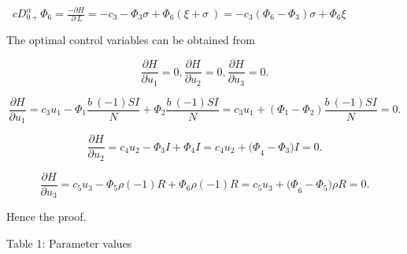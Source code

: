 \documentclass[10pt]{NSP1}
\begin{document}
$\ $ ${cD}_{0 +}^{\alpha}\Phi_{6} = \frac{- \partial H}{\ \ \partial\ L\ } = - c_{3} - \Phi_{3}\sigma + \Phi_{6}(\xi + \sigma\ ) = - c_{3}\left( \Phi_{6} - \Phi_{3} \right)\sigma + \Phi_{6}\xi$

The optimal control variables can be obtained from

\begin{equation}
\frac{\partial H}{\partial u_{1}} = 0,\frac{\partial H}{\partial u_{2}} = 0,\frac{\partial H}{\partial u_{3}} = 0.

\end{equation}

\begin{equation}
\frac{\partial H}{\partial u_{1}} = c_{3}u_{1} - \Phi_{1}\frac{b\ ( - 1)SI}{N} + \Phi_{2}\frac{b\ ( - 1)SI}{N} = c_{3}u_{1} + \left( \Phi_{1} - \Phi_{2} \right)\frac{b\ ( - 1)SI}{N} = 0.

\end{equation}

\begin{equation}
\frac{\partial H}{\partial u_{2}} = c_{4}u_{2} - \Phi_{3}I + \Phi_{4}I = c_{4}u_{2} + {(\Phi}_{4} - \Phi_{3})I = 0.

\end{equation}

\begin{equation}
\frac{\partial H}{\partial u_{3}} = c_{5}u_{3} - \Phi_{5}\rho( - 1)R + \Phi_{6}\rho( - 1)R = c_{5}u_{3} + {(\Phi}_{6} - \Phi_{5})\rho R = 0.

\end{equation}

Hence the proof.

Table 1: Parameter values
\end{document}
